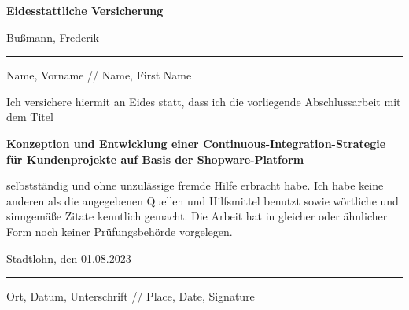
\thispagestyle{empty}
    \begingroup
        \fontsize{18pt}{20pt}\selectfont
        {\bfseries Eidesstattliche Versicherung}
    \endgroup

    \vskip 0.8cm

    \begingroup
        \fontsize{12pt}{14pt}\selectfont
        Bußmann, Frederik
    \endgroup

    \vskip -0.4cm

    \noindent\rule{14.4cm}{0.4pt}

    \vskip -0.25cm

    \begingroup
        \fontsize{8pt}{6pt}\selectfont
        Name, Vorname // Name, First Name
    \endgroup

    \vskip 0.6cm
    \begingroup
        \fontsize{10.5pt}{11.5pt}\selectfont
        Ich versichere hiermit an Eides statt, dass ich die vorliegende Abschlussarbeit mit dem Titel
    \endgroup

    \vskip 0.3cm

    \begingroup
        \fontsize{12pt}{14pt}\selectfont
        {\bfseries Konzeption und Entwicklung einer Continuous-Integration-Strategie für Kundenprojekte auf Basis der
        Shopware-Platform}
    \endgroup

    \vskip 0.3cm

    \begingroup
        \fontsize{10.5pt}{11.5pt}\selectfont
        selbstständig und ohne unzulässige fremde Hilfe erbracht habe.
        Ich habe keine anderen als die angegebenen Quellen und Hilfsmittel benutzt sowie wörtliche und sinngemäße
        Zitate kenntlich gemacht.
        Die Arbeit hat in gleicher oder ähnlicher Form noch keiner Prüfungsbehörde vorgelegen.
    \endgroup

    \vskip 0.8cm
    {\fontsize{12pt}{14pt}\selectfont
    Stadtlohn, den 01.08.2023}

    \vskip -0.4cm

    \noindent\rule{14.4cm}{0.4pt}

    \vskip -0.25cm

    \begingroup
        \fontsize{8pt}{6pt}\selectfont
        Ort, Datum, Unterschrift // Place, Date, Signature
    \endgroup
\restoregeometry
\clearpage
